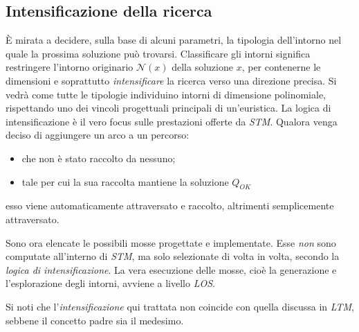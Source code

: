 \subsection{Intensificazione della ricerca} %
\label{subsec:neighbourhoods}
	È mirata a decidere, sulla base di alcuni parametri, la tipologia dell'intorno nel quale la prossima soluzione può trovarsi.
	Classificare gli intorni significa restringere l'intorno originario $\mathcal{N}(x)$ della soluzione $x$, per contenerne le
	dimensioni e soprattutto \emph{intensificare} la ricerca verso una direzione precisa. Si vedrà come tutte le tipologie individuino 
	intorni di dimensione polinomiale, rispettando uno dei vincoli progettuali principali di un'euristica. 
	La logica di intensificazione è il vero focus sulle prestazioni offerte da \emph{STM}.
	Qualora venga deciso di aggiungere un arco a un percorso:
	\begin{itemize} 
		\item che non è stato raccolto da nessuno;
		\item tale per cui la sua raccolta mantiene la soluzione $Q_{OK}$
	\end{itemize}
	esso viene automaticamente attraversato e raccolto, altrimenti semplicemente attraversato.
	
	Sono ora elencate le possibili mosse progettate e implementate. Esse \emph{non} sono computate all'interno di \emph{STM}, ma solo selezionate
	di volta in volta, secondo la \emph{logica di intensificazione}. La vera esecuzione delle mosse, cioè la generazione e l'esplorazione degli intorni, avviene a livello \emph{LOS}.
	
	Si noti che l'\emph{intensificazione} qui trattata non coincide con quella discussa in \emph{LTM}, sebbene il concetto padre sia il medesimo.
